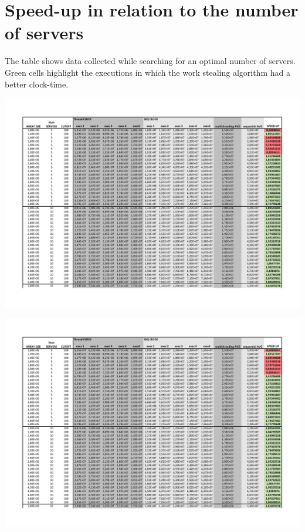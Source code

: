 \documentclass{article}
\begin{document}

\onecolumn
\appendix


\section{Speed-up in relation to the number of servers}
The table shows data collected while searching for an optimal number of servers. Green cells highlight the executions in which the work stealing algorithm had a better clock-time.

\begingroup
\centering
\hspace*{-1.5in}
\includegraphics[page=1, width=1.5\linewidth]{imgs/ServerNumAnalysis.pdf}

\newpage
\hspace*{-1.5in}
\includegraphics[page=2, width=1.5\linewidth]{imgs/ServerNumAnalysis.pdf}%
\end{document}
